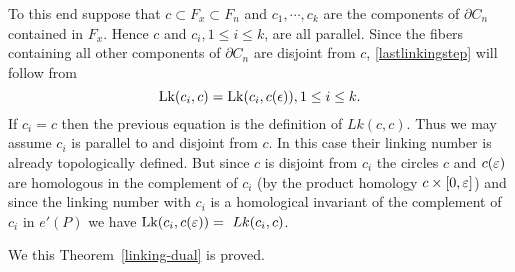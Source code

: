 To this end suppose that $c \subset F_x \subset F_n$ and $c_1,\cdots,c_k$ are the components of $\partial C_n$ contained in $F_x$. Hence
$c$ and $c_i,1 \leq i \leq k$, are all parallel. Since the fibers containing all other components of $\partial C_n$ are disjoint from $c$, \eqref{lastlinkingstep} will follow from
\[
\operatorname{Lk}(c_i,c) = \operatorname{Lk}(c_i, c(\epsilon)), 1 \leq i \leq k.
\]
If $c_i = c$ then the previous equation is the definition of $Lk(c,c)$. Thus we may assume $c_i$ is parallel to and disjoint from $c$. 
In this case their linking number is already topologically defined.
But since $c$ is disjoint from $c_i$ the circles $c$ and $c(\varepsilon)$ are homologous in the complement of $c_i$ (by the product homology $c \times [0,\varepsilon]$) and since the linking number with $c_i$ is a homological invariant of the complement of $c_i$ in $e'(P)$ we have 
$\operatorname{Lk}(c_i, c(\varepsilon)) =\ Lk(c_i, c)$.

We this Theorem~\ref{linking-dual} is proved. 




